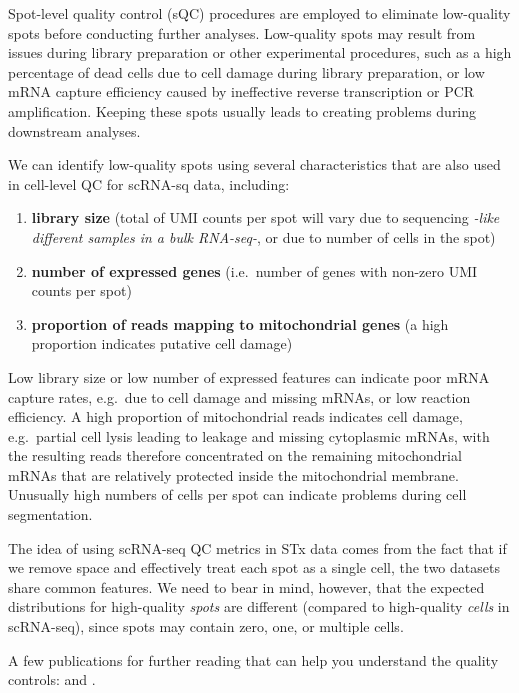 \documentclass[
]{book}
\providecommand{\tightlist}{%
  \setlength{\itemsep}{0pt}\setlength{\parskip}{0pt}}
\begin{document}
Spot-level quality control (sQC) procedures are employed to eliminate low-quality spots before conducting further analyses. Low-quality spots may result from issues during library preparation or other experimental procedures, such as a high percentage of dead cells due to cell damage during library preparation, or low mRNA capture efficiency caused by ineffective reverse transcription or PCR amplification. Keeping these spots usually leads to creating problems during downstream analyses.

We can identify low-quality spots using several characteristics that are also used in cell-level QC for scRNA-sq data, including:

\begin{enumerate}
\def\labelenumi{\arabic{enumi}.}
\tightlist
\item
  \textbf{library size} (total of UMI counts per spot will vary due to sequencing \emph{-like different samples in a bulk RNA-seq-}, or due to number of cells in the spot)
\item
  \textbf{number of expressed genes} (i.e.~number of genes with non-zero UMI counts per spot)
\item
  \textbf{proportion of reads mapping to mitochondrial genes} (a high proportion indicates putative cell damage)
\end{enumerate}

Low library size or low number of expressed features can indicate poor mRNA capture rates, e.g.~due to cell damage and missing mRNAs, or low reaction efficiency. A high proportion of mitochondrial reads indicates cell damage, e.g.~partial cell lysis leading to leakage and missing cytoplasmic mRNAs, with the resulting reads therefore concentrated on the remaining mitochondrial mRNAs that are relatively protected inside the mitochondrial membrane. Unusually high numbers of cells per spot can indicate problems during cell segmentation.

The idea of using scRNA-seq QC metrics in STx data comes from the fact that if we remove space and effectively treat each spot as a single cell, the two datasets share common features. We need to bear in mind, however, that the expected distributions for high-quality \emph{spots} are different (compared to high-quality \emph{cells} in scRNA-seq), since spots may contain zero, one, or multiple cells.

A few publications for further reading that can help you understand the quality controls: \citet{McCarthy2017Apr} and \citet{Amezquita2020Feb}.
\end{document}

